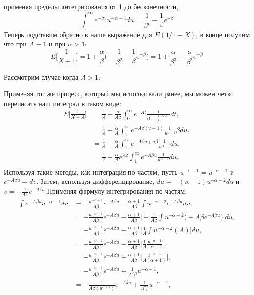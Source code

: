 \documentclass[13pt]{article}
\begin{document}
применяя пределы интегрирования от 1 до бесконечности, 
\begin{equation*}
\int_{1}^{\infty} e^{-\beta u}u^{-\alpha - 1}du = \frac{1}{\beta^{2}} - \frac{1}{\beta}e^{-\beta}
\end{equation*}
Теперь подставим обратно в наше выражение для $E(1/1+X)$, в конце получим  что при $A=1$ и при $\alpha>1$:
\begin{equation}\label{eq:31}
  E\bigg[\frac{1}{X+1}\bigg] =1 + \frac{\alpha}{\beta}\bigg(-\frac{1}{\beta^{2}} - \frac{1}{\beta}e^{-\beta} \bigg) = 1 + \frac{\alpha}{\beta^{3}} - \frac{\alpha}{\beta^{2}}e^{-\beta} 
\end{equation}

Рассмотрим случае когда $A>1$:\par
Применяя тот же процесс, который мы использовали ранее, мы можем четко переписать наш интеграл в таком виде: 
\begin{align*}
    E\bigg[\frac{1}{X+A} \bigg] &= \frac{1}{A} + \frac{\alpha}{A\beta} \int_{0}^{\infty} e^{-At}\frac{1}{\big( 1 + \frac{t}{\beta}\big)^{\alpha + 1}}dt, \\
    &=  \frac{1}{A} + \frac{\alpha}{A} \int_{1}^{\infty} e^{-A\beta(u - 1)}\frac{1}{u^{\alpha + 1}}\beta du, \\
    &=  \frac{1}{A} + \frac{\alpha}{A} \int_{1}^{\infty} e^{-A \beta u + a\beta}\frac{1}{u^{\alpha + 1}}du,\\
    &= \frac{1}{A} + \frac{\alpha}{A}e^{A\beta}  \int_{1}^{\infty}e^{-A\beta u}\frac{1}{u^{\alpha + 1}}du,\\
\end{align*}
Используя такие методы, как интеграция по частям, пусть $u^{-\alpha -1 } = u ^{-\alpha -1}$ и $e^{-A\beta u} = dv$. Затем, используя дифференцирование, $du= -(\alpha + 1)u^{-\alpha -2 }du$ и $v=-\frac{1}{A\beta}e^{-A\beta u}$.Применяя формулу интегрирования по частям:
\begin{align*}
  \int e^{-A\beta u}u^{-\alpha - 1}du &= - \frac{u^{-\alpha -1}}{A\beta}e^{-A\beta u}-\frac{\alpha + 1}{A\beta} \int u^{-\alpha - 2}e^{-A\beta u}du,\\   
  &= -\frac{u^{-\alpha -1}}{A\beta}e^{-A\beta u} - \frac{\alpha + 1}{A\beta}\bigg[ -\frac{1}{A\beta} \int u^{-\alpha - 2}\big(-A\beta e^{-A\beta u} \big) \bigg]du, \\
  &= - \frac{u^{-\alpha -1}}{A\beta}e^{-A\beta u} - \frac{\alpha + 1}{A\beta}\bigg[\frac{1}{A} \int u^{-\alpha - 2}(A)\bigg]du,\\
  &= - \frac{u^{-\alpha -1}}{A\beta}e^{-A\beta u} -\frac{\alpha + 1}{A\beta}\bigg[\frac{1}{A} \frac{u^{-\alpha - 1}}{-\alpha - 1}\bigg], \\
  &= - \frac{u^{-\alpha -1}}{A\beta}e^{-A\beta u} + \frac{\alpha + 1}{A\beta} \bigg[ \frac{u^{-\alpha - 1}}{A(\alpha + 1)}\bigg], \\
  &= - \frac{u^{-\alpha -1}}{A\beta}e^{-A\beta u} + \frac{1}{A^{2}\beta}u^{-\alpha - 1},\\
  &= - \frac{1}{A\beta(u^{\alpha +1})}e^{-A\beta u} + \frac{1}{A^{2}\beta}u^{-\alpha - 1},
\end{align*}
\end{document}
